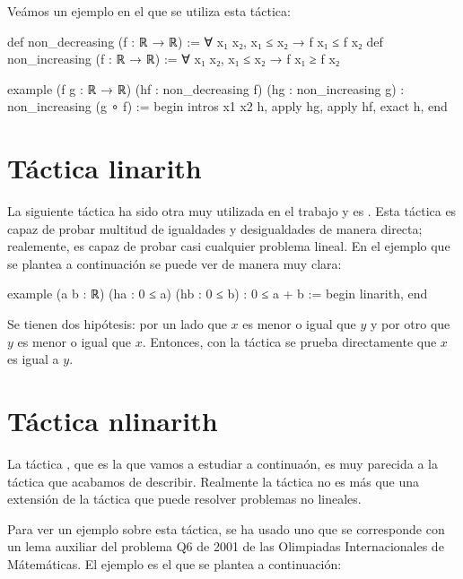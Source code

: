 Veámos un ejemplo en el que se utiliza esta táctica:
\begin{leancode}
def non_decreasing (f : ℝ → ℝ) := ∀ x₁ x₂, x₁ ≤ x₂ → f x₁ ≤ f x₂
def non_increasing (f : ℝ → ℝ) := ∀ x₁ x₂, x₁ ≤ x₂ → f x₁ ≥ f x₂

example (f g : ℝ → ℝ) (hf : non_decreasing f) (hg : non_increasing g) :
non_increasing (g ∘ f) :=
begin
  intros x1 x2 h,
  apply hg,
  apply hf,
  exact h,
end
\end{leancode}

\section{Táctica linarith}

La siguiente táctica ha sido otra muy utilizada en el trabajo y es
. Esta táctica es capaz de probar multitud de
igualdades y desigualdades de manera directa; realemente, es capaz de probar
casi cualquier problema lineal. En el ejemplo que se plantea a continuación
se puede ver de manera muy clara:

\begin{leancode}
example (a b : ℝ) (ha : 0 ≤ a) (hb : 0 ≤ b) : 0 ≤ a + b :=
begin
  linarith,
end
\end{leancode}

Se tienen dos hipótesis: por un lado que \(x\) es menor o igual que \(y\) y por
otro que \(y\) es menor o igual que \(x\). Entonces, con la táctica
 se prueba directamente que \(x\) es igual a \(y\).


\section{Táctica nlinarith}

La táctica , que es la que vamos a estudiar a
continuaón, es muy parecida a la táctica  que
acabamos de describir. Realmente la táctica  no
es más que una extensión de la táctica  que puede
resolver problemas no lineales.

Para ver un ejemplo sobre esta táctica, se ha usado uno que se corresponde con
un lema auxiliar del problema Q6 de 2001 de las Olimpiadas Internacionales de
Mátemáticas. El ejemplo es el que se plantea a continuación:

